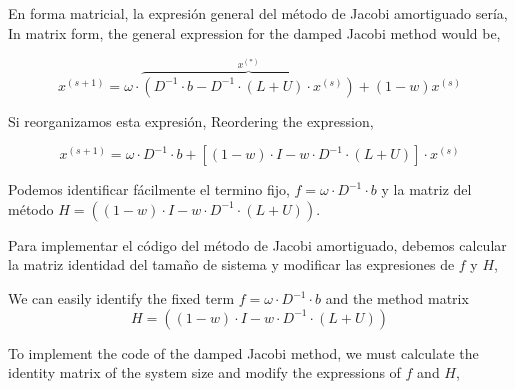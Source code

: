 \begin{paracol}{2}

En forma matricial, la expresión general del método de Jacobi amortiguado sería,
\switchcolumn
In matrix form, the general expression for the damped Jacobi method would be,
\end{paracol}
\begin{equation*}
x^{(s+1)}=\omega\cdot\overbrace{\left(D^{-1}\cdot b- D^{-1}\cdot\left(L+U\right)\cdot x^{(s)}\right)}^{x^{(*)}}+(1-w)x^{(s)}
\end{equation*}

\begin{paracol}{2}
Si reorganizamos esta expresión,
\switchcolumn
Reordering the expression,
\end{paracol}


\begin{equation*}
x^{(s+1)}=\omega\cdot D^{-1}\cdot b+ \left[(1-w)\cdot I - w\cdot  D^{-1}\cdot  \left(L+U \right)\right]\cdot x^{(s)}
\end{equation*}

\begin{paracol}{2}
Podemos identificar fácilmente el termino fijo, $f=\omega\cdot D^{-1}\cdot b$ y la matriz del método $H=\left((1-w)\cdot I - w\cdot  D^{-1}\cdot  \left(L+U \right)\right)$.

Para implementar el código del método de Jacobi amortiguado, debemos calcular la matriz identidad del tamaño de sistema y modificar las expresiones de $f$ y $H$,

\switchcolumn
We can easily identify the fixed term  $f=\omega\cdot D^{-1}\cdot b$ and the method matrix $$H=\left((1-w)\cdot I - w\cdot  D^{-1}\cdot  \left(L+U \right)\right)$$

To implement the code of the damped Jacobi method, we must calculate the identity matrix of the system size and modify the expressions of $f$ and $H$,

\end{paracol}

